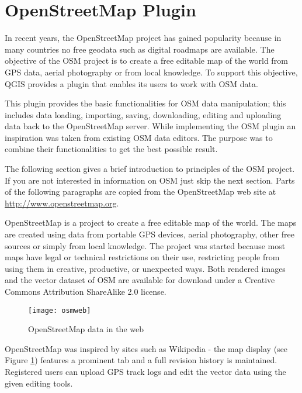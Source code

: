 
\section{OpenStreetMap Plugin}\label{plugins_osm}

\updatedisclaimer

In recent years, the OpenStreetMap project has gained popularity because in many countries no free geodata such as digital roadmaps are available.
The objective of the OSM project is to create a free editable map of the world from GPS data, aerial photography or from local knowledge. To
support this objective, QGIS provides a plugin that enables its users to work with OSM data.

This plugin provides the basic functionalities for OSM data manipulation; this includes data loading, importing, saving, downloading, editing and
uploading data back to the OpenStreetMap server. While implementing the OSM plugin an inspiration was taken from existing OSM data editors. The
purpose was to combine their functionalities to get the best possible result.

The following section gives a brief introduction to principles of the OSM project. If you are not interested in information on OSM just skip the next
section. Parts of the following paragraphs are copied from the OpenStreetMap web site at \url{http://www.openstreetmap.org}.


OpenStreetMap is a project to create a free editable map of the world. The maps are created using data from portable GPS devices, aerial photography,
other free sources or simply from local knowledge. The project was started because most maps have legal or technical restrictions on their use, restricting people from using them in creative, productive, or unexpected ways. Both rendered images and the vector dataset of OSM are available for download under a Creative Commons Attribution ShareAlike 2.0 license.

\begin{figure}[ht]
   \centering
   \texttt{[image: osmweb]}
   \caption{OpenStreetMap data in the web \nixcaption}\label{fig:osmweb}
\end{figure}

OpenStreetMap was inspired by sites such as Wikipedia - the map display
(see Figure \ref{fig:osmweb}) features a prominent  tab and a
full revision history is maintained. Registered users can upload GPS track
logs and edit the vector data using the given editing tools.

